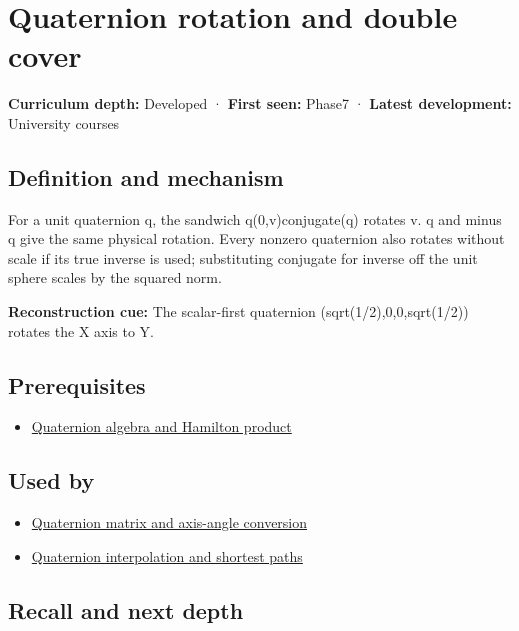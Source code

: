 \hypertarget{appendix-8e61ab68f6b2}{}
\section{Quaternion rotation and double cover}\label{appendix-8e61ab68f6b2-quaternion-rotation-and-double-cover}

\textbf{Curriculum depth:} Developed · \textbf{First seen:} Phase7 · \textbf{Latest development:} University courses

\subsection{Definition and mechanism}\label{appendix-8e61ab68f6b2-definition-and-mechanism}

For a unit quaternion q, the sandwich q(0,v)conjugate(q) rotates v. q and minus q give the same physical rotation. Every nonzero quaternion also rotates without scale if its true inverse is used; substituting conjugate for inverse off the unit sphere scales by the squared norm.

\textbf{Reconstruction cue:} The scalar-first quaternion (sqrt(1/2),0,0,sqrt(1/2)) rotates the X axis to Y.

\subsection{Prerequisites}\label{appendix-8e61ab68f6b2-prerequisites}

\begin{itemize}
\tightlist
\item
  \hyperref[appendix-965d9260eeab]{Quaternion algebra and Hamilton product}
\end{itemize}

\subsection{Used by}\label{appendix-8e61ab68f6b2-used-by}

\begin{itemize}
\tightlist
\item
  \hyperref[appendix-26d8da71f6c4]{Quaternion matrix and axis-angle conversion}
\item
  \hyperref[appendix-9b4b8254f26b]{Quaternion interpolation and shortest paths}
\end{itemize}

\subsection{Recall and next depth}\label{appendix-8e61ab68f6b2-recall-and-next-depth}

